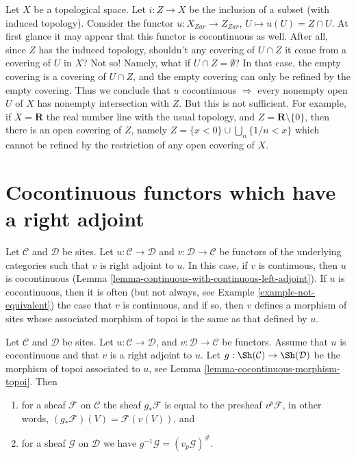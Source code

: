 \begin{example}
\label{example-closed-map-cocontinuous-false}
Let $X$ be a topological space.
Let $i : Z  \to X$ be the inclusion of a subset (with induced
topology). Consider the functor $u : X_{Zar} \to Z_{Zar}$,
$U \mapsto u(U) = Z \cap U$.
At first glance it may appear that this functor is cocontinuous as
well. After all, since $Z$ has the induced topology,
shouldn't any covering of $U\cap Z$ it come from a covering
of $U$ in $X$? Not so! Namely, what if $U \cap Z = \emptyset$?
In that case, the empty covering is a covering of
$U \cap Z$, and the empty covering can only be refined by
the empty covering. Thus we conclude that
$u$ cocontinuous $\Rightarrow$ every nonempty open $U$
of $X$ has nonempty intersection with $Z$.
But this is not sufficient. For example, if
$X = \mathbf{R}$ the real number line with the usual
topology, and $Z = \mathbf{R} \setminus \{0\}$, then
there is an open covering of $Z$, namely
$Z = \{x < 0\} \cup \bigcup_n \{1/n < x\}$ which
cannot be refined by the restriction of any
open covering of $X$.
\end{example}







\section{Cocontinuous functors which have a right adjoint}
\label{section-cocontinuous-adjoint}

\noindent
Let $\mathcal{C}$ and $\mathcal{D}$ be sites. Let
$u : \mathcal{C} \to \mathcal{D}$ and $v : \mathcal{D} \to \mathcal{C}$
be functors of the underlying categories such that $v$ is right adjoint to $u$.
In this case, if $v$ is continuous, then $u$ is cocontinuous
(Lemma \ref{lemma-continuous-with-continuous-left-adjoint}).
If $u$ is cocontinuous, then it is often
(but not always, see Example \ref{example-not-equivalent})
the case that $v$ is continuous, and if so, then
$v$ defines a morphism of sites whose
associated morphism of topoi is the same as that defined by $u$.

\begin{lemma}
\label{lemma-have-functor-other-way}
Let $\mathcal{C}$ and $\mathcal{D}$ be sites. Let
$u : \mathcal{C} \to \mathcal{D}$, and $v : \mathcal{D} \to \mathcal{C}$
be functors. Assume that $u$ is cocontinuous
and that $v$ is a right adjoint to $u$.
Let $g : \Sh(\mathcal{C}) \to \Sh(\mathcal{D})$ be
the morphism of topoi associated to $u$, see
Lemma \ref{lemma-cocontinuous-morphism-topoi}.
Then
\begin{enumerate}
\item for a sheaf $\mathcal{F}$ on $\mathcal{C}$ the sheaf
$g_*\mathcal{F}$ is equal to the presheaf $v^p\mathcal{F}$, in other words,
$(g_*\mathcal{F})(V) = \mathcal{F}(v(V))$, and
\item for a sheaf $\mathcal{G}$ on $\mathcal{D}$ we have
$g^{-1}\mathcal{G} = (v_p\mathcal{G})^\#$.
\end{enumerate}
\end{lemma}

